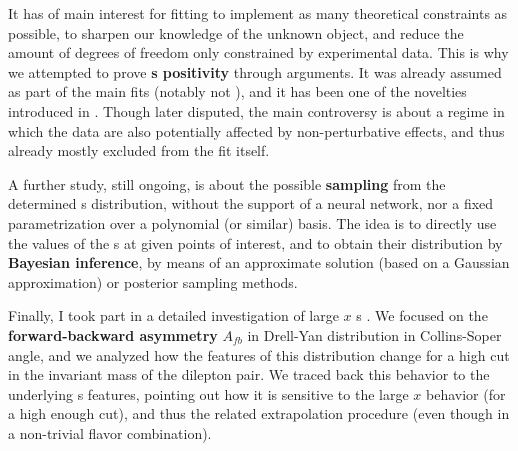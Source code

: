 It has of main interest for fitting to implement as many theoretical
constraints as possible, to sharpen our knowledge of the unknown object, and
reduce the amount of degrees of freedom only constrained by experimental data.
This is why we attempted to prove \textbf{\pdf{}s positivity}
 through \pqcd{} arguments.
It was already assumed as part of the main \pdf{} fits (notably not
), and it has been one of the novelties introduced in .
Though later disputed, the main controversy is about a regime in which the data
are also potentially affected by non-perturbative effects, and thus already
mostly excluded from the fit itself.

A further study, still ongoing, is about the possible \textbf{sampling} from
the determined \pdf{}s distribution, without the support of a neural network,
nor a fixed parametrization over a polynomial (or similar) basis.
The idea is to directly use the values of the \pdf{}s at given points of
interest, and to obtain their distribution by \textbf{Bayesian inference}, by
means of an approximate solution (based on a Gaussian approximation) or
posterior sampling methods.

Finally, I took part in a detailed investigation of large $x$ \pdf{}s
.
We focused on the \textbf{forward-backward asymmetry} $A_{fb}$ in Drell-Yan
distribution in Collins-Soper angle, and we analyzed how the features of this
distribution change for a high cut in the invariant mass of the dilepton pair.
We traced back this behavior to the underlying \pdf{}s features, pointing out
how it is sensitive to the large $x$ behavior (for a high enough cut), and thus
the related extrapolation procedure (even though in a non-trivial flavor
combination).
